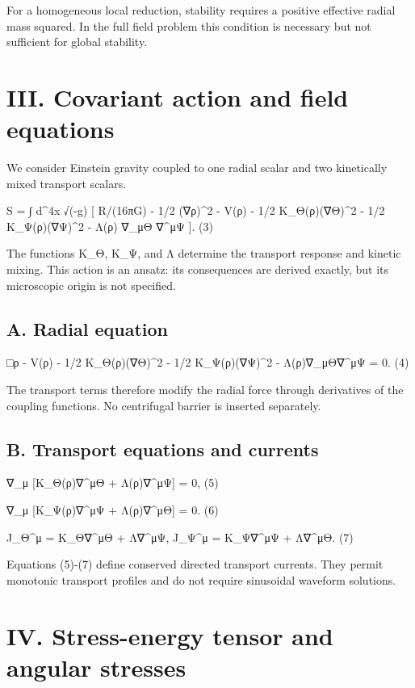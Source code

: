 For a homogeneous local reduction, stability requires a positive
effective radial mass squared. In the full field problem this condition
is necessary but not sufficient for global stability.

\section{III. Covariant action and field
equations}\label{iii.-covariant-action-and-field-equations}

We consider Einstein gravity coupled to one radial scalar and two
kinetically mixed transport scalars.

S = ∫ d\^{}4x √(-g) {[} R/(16πG) - 1/2 (∇ρ)\^{}2 - V(ρ) - 1/2
K\_Θ(ρ)(∇Θ)\^{}2 - 1/2 K\_Ψ(ρ)(∇Ψ)\^{}2 - Λ(ρ) ∇\_μΘ ∇\^{}μΨ {]}. (3)

The functions K\_Θ, K\_Ψ, and Λ determine the transport response and
kinetic mixing. This action is an ansatz: its consequences are derived
exactly, but its microscopic origin is not specified.

\subsection{A. Radial equation}\label{a.-radial-equation}

□ρ - V\textquotesingle(ρ) - 1/2 K\_Θ\textquotesingle(ρ)(∇Θ)\^{}2 - 1/2
K\_Ψ\textquotesingle(ρ)(∇Ψ)\^{}2 - Λ\textquotesingle(ρ)∇\_μΘ∇\^{}μΨ = 0.
(4)

The transport terms therefore modify the radial force through
derivatives of the coupling functions. No centrifugal barrier is
inserted separately.

\subsection{B. Transport equations and
currents}\label{b.-transport-equations-and-currents}

∇\_μ {[}K\_Θ(ρ)∇\^{}μΘ + Λ(ρ)∇\^{}μΨ{]} = 0, (5)

∇\_μ {[}K\_Ψ(ρ)∇\^{}μΨ + Λ(ρ)∇\^{}μΘ{]} = 0. (6)

J\_Θ\^{}μ = K\_Θ∇\^{}μΘ + Λ∇\^{}μΨ, J\_Ψ\^{}μ = K\_Ψ∇\^{}μΨ + Λ∇\^{}μΘ.
(7)

Equations (5)-(7) define conserved directed transport currents. They
permit monotonic transport profiles and do not require sinusoidal
waveform solutions.

\section{IV. Stress-energy tensor and angular
stresses}\label{iv.-stress-energy-tensor-and-angular-stresses}

